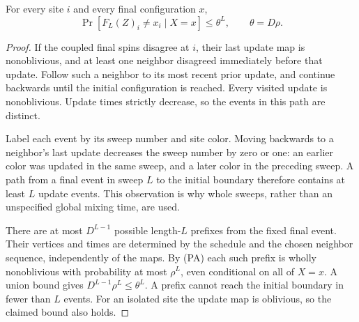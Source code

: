 \begin{lemma}
\label{lem:resolution-dynamics-coupling}
For every site \(i\) and every final configuration \(x\),
\[
 \Pr[F_L(Z)_i\ne x_i\mid X=x]\le\theta^L,
 \qquad \theta=D\rho.
 \tag{CE}
\]
\end{lemma}

\begin{proof}
If the coupled final spins disagree at \(i\), their last update map
is nonoblivious, and at least one neighbor disagreed immediately before
that update. Follow such a neighbor to its most recent prior update,
and continue backwards until the initial configuration is reached.
Every visited update is nonoblivious. Update times strictly decrease,
so the events in this path are distinct.

Label each event by its sweep number and site color. Moving backwards
to a neighbor's last update decreases the sweep number by zero or one:
an earlier color was updated in the same sweep, and a later color in
the preceding sweep. A path from a final event in sweep \(L\) to
the initial boundary therefore contains at least \(L\) update events.
This observation is why whole sweeps, rather than an unspecified
global mixing time, are used.

There are at most \(D^{L-1}\) possible length-\(L\) prefixes from
the fixed final event. Their vertices and times are determined by the
schedule and the chosen neighbor sequence, independently of the maps.
By (PA) each such prefix is wholly nonoblivious with probability at
most \(\rho^L\), even conditional on all of \(X=x\). A union bound
gives \(D^{L-1}\rho^L\le\theta^L\). A prefix cannot reach the
initial boundary in fewer than \(L\) events. For an isolated site
the update map is oblivious, so the claimed bound also holds.
\end{proof}
